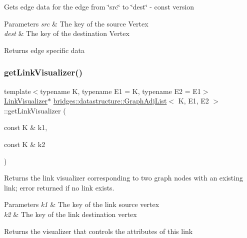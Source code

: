 Gets edge data for the edge from \char`\"{}src\char`\"{} to \char`\"{}dest\char`\"{} -\/ const version


\begin{DoxyParams}{Parameters}
{\em src} & The key of the source Vertex \\
\hline
{\em dest} & The key of the destination Vertex\\
\hline
\end{DoxyParams}
\begin{DoxyReturn}{Returns}
edge specific data 
\end{DoxyReturn}
\mbox{\label{classbridges_1_1datastructure_1_1_graph_adj_list_ae36ba10fae403339df0c36707ed13536}} 
\subsubsection{\texorpdfstring{get\+Link\+Visualizer()}{getLinkVisualizer()}}
{\footnotesize\ttfamily template$<$typename K, typename E1 = K, typename E2 = E1$>$ \\
\mbox{\hyperlink{classbridges_1_1datastructure_1_1_link_visualizer}{Link\+Visualizer}}$\ast$ \mbox{\hyperlink{classbridges_1_1datastructure_1_1_graph_adj_list}{bridges\+::datastructure\+::\+Graph\+Adj\+List}}$<$ K, E1, E2 $>$\+::get\+Link\+Visualizer (\begin{DoxyParamCaption}\item[{const K \&}]{k1,  }\item[{const K \&}]{k2 }\end{DoxyParamCaption})\hspace{0.3cm}{\ttfamily [inline]}}

Returns the link visualizer corresponding to two graph nodes with an existing link; error returned if no link exists.


\begin{DoxyParams}{Parameters}
{\em k1} & The key of the link source vertex \\
\hline
{\em k2} & The key of the link destination vertex\\
\hline
\end{DoxyParams}
\begin{DoxyReturn}{Returns}
the visualizer that controls the attributes of this link 
\end{DoxyReturn}
\mbox{\label{classbridges_1_1datastructure_1_1_graph_adj_list_ada58af550495cee2fe454c0be0f8504e}} 
